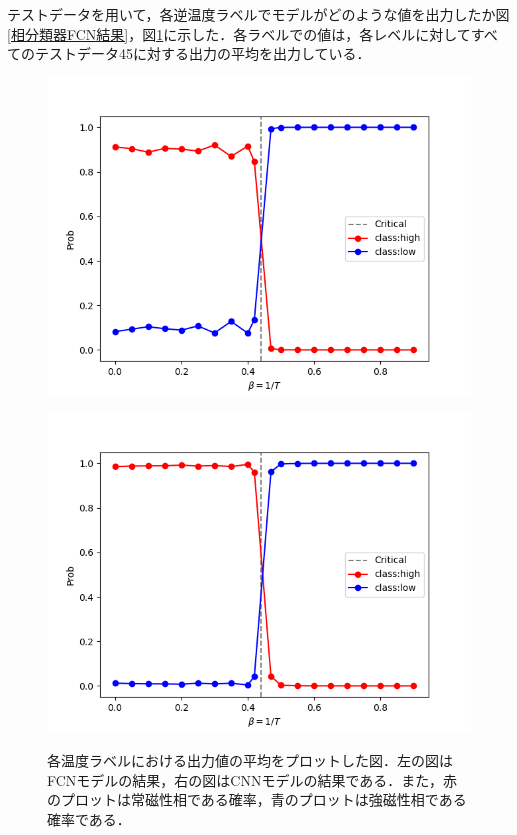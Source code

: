 \documentclass[a4paper,11pt]{jsreport}
\begin{document}
テストデータを用いて，各逆温度ラベルでモデルがどのような値を出力したか図\ref{相分類器FCN結果}，図\ref{相分類器CNN結果}に示した．各ラベルでの値は，各レベルに対してすべてのテストデータ45に対する出力の平均を出力している．
\begin{figure}[H]
  \begin{minipage}[b]{0.45\linewidth}
    \begin{center}
      \includegraphics[keepaspectratio, scale=0.4]{image/plot_square_FCNN.png}
      \label{相分類器FCN結果}
    \end{center}
  \end{minipage}
  \begin{minipage}[b]{0.45\linewidth}
    \begin{center}
      \includegraphics[keepaspectratio, scale=0.4]{image/plot_square_CNN.png}
      \label{相分類器CNN結果}
    \end{center}
  \end{minipage}
  \caption{各温度ラベルにおける出力値の平均をプロットした図．左の図はFCNモデルの結果，右の図はCNNモデルの結果である．また，赤のプロットは常磁性相である確率，青のプロットは強磁性相である確率である．}
\end{figure}
\end{document}

